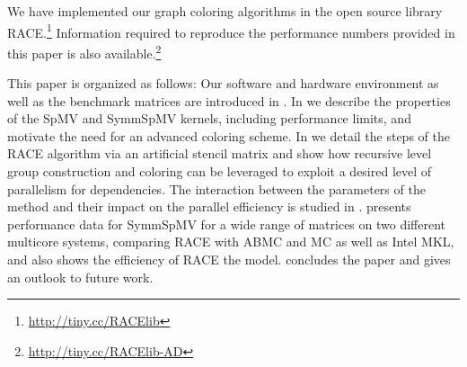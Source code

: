 \begin{itemize}
\end{itemize}
We have implemented our graph coloring algorithms in the open source library \acrfull{RACE}.\footnote{\href{http://tiny.cc/RACElib}{http://tiny.cc/RACElib}}
Information required to reproduce the performance numbers provided in this 
paper is also available.\footnote{\href{http://tiny.cc/RACElib-AD}{http://tiny.cc/RACElib-AD}}


This paper is organized as follows: Our software and hardware environment as well as
 the benchmark matrices are introduced in . 
In  we describe the properties
of the \acrshort{SpMV} and \acrshort{SymmSpMV} kernels, including
\roofline performance limits, and motivate the need for an advanced coloring scheme.
In  we detail the steps of the \acrshort{RACE} algorithm
via an artificial stencil matrix and show how recursive level group construction
and coloring can be leveraged to exploit a desired level of parallelism
for \DK dependencies. The interaction between the parameters of the method
and their impact on the parallel efficiency is studied in .
 presents performance data for \acrshort{SymmSpMV}
for a wide range of matrices on two different multicore systems,
comparing \acrshort{RACE} with \acrshort{ABMC} and \acrshort{MC} as well as
Intel MKL, and also shows the efficiency of \acrshort{RACE} 
  the \roofline model.
 concludes the paper and gives an outlook to
future work. 


